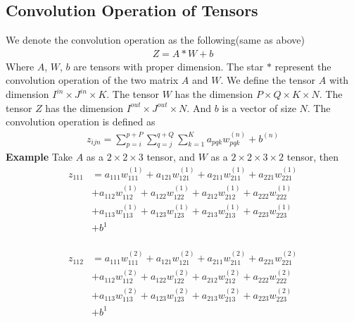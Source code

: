 \documentclass[a4paper]{article}
\begin{document}
\subsection{Convolution Operation of Tensors}
We denote the convolution operation as the following(same as above)
\begin{align*}
	Z= A*W +b
\end{align*}
Where $A$, $W$, $b$ are tensors with proper dimension. The star $*$ represent the convolution operation of the two matrix $A$ and $W$. We define the tensor $A$ with dimension $I^{in} \times J^{in} \times K$. The tensor $W$ has the dimension $P \times Q \times K \times N$. The tensor $Z$ has the dimension $I^{out} \times J^{out} \times N$. And $b$ is a vector of size $N$. The convolution operation is defined as 
\begin{align*}
	z_{ijn} = \sum_{p=i}^{p+P} \sum_{q=j}^{q+Q} \sum_{k=1}^{K} a_{pqk} w_{pqk}^{(n)} + b^{(n)}
\end{align*}
{\bf Example}
Take $A$ as a $2 \times 2 \times 3$ tensor, and $W$ as a $2 \times 2 \times 3 \times 2$ tensor, then 
\begin{align*}
z_{111} & = a_{111} w_{111}^{(1)} + a_{121} w_{121}^{(1)} + a_{211} w_{211}^{(1)} + a_{221} w_{221}^{(1)}\\
		& + a_{112} w_{112}^{(1)} + a_{122} w_{122}^{(1)} + a_{212} w_{212}^{(1)} + a_{222} w_{222}^{(1)}\\	
		& + a_{113} w_{113}^{(1)} + a_{123} w_{123}^{(1)} + a_{213} w_{213}^{(1)} + a_{223} w_{223}^{(1)}\\	
		& + b^{1}\\
\end{align*}

\begin{align*}
z_{112} & = a_{111} w_{111}^{(2)} + a_{121} w_{121}^{(2)} + a_{211} w_{211}^{(2)} + a_{221} w_{221}^{(2)}\\
		& + a_{112} w_{112}^{(2)} + a_{122} w_{122}^{(2)} + a_{212} w_{212}^{(2)} + a_{222} w_{222}^{(2)}\\	
		& + a_{113} w_{113}^{(2)} + a_{123} w_{123}^{(2)} + a_{213} w_{213}^{(2)} + a_{223} w_{223}^{(2)}\\	
		& + b^{1}\\
\end{align*}
\end{document}
